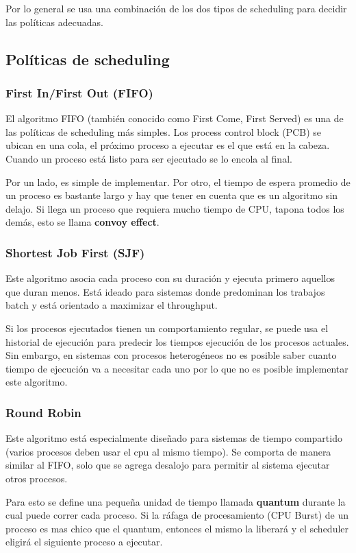 	Por lo general se usa una combinación de los dos tipos de scheduling para decidir las políticas adecuadas.

	\subsection{Políticas de scheduling}
	\subsubsection{First In/First Out (FIFO)}
	El algoritmo FIFO (también conocido como First Come, First Served) es una de las políticas de scheduling más simples. Los process control block (PCB) se ubican en una cola, el próximo proceso a ejecutar es el que está en la cabeza. Cuando un proceso está listo para ser ejecutado se lo encola al final.
	
	Por un lado, es simple de implementar. Por otro, el tiempo de espera promedio de un proceso es bastante largo y hay que tener en cuenta que es un algoritmo sin delajo. Si llega un proceso que requiera mucho tiempo de CPU, tapona todos los demás, esto se llama \textbf{convoy effect}.
	
	\subsubsection{Shortest Job First (SJF)}
	Este algoritmo asocia cada proceso con su duración y ejecuta primero aquellos que duran menos. Está ideado para sistemas donde predominan los trabajos batch y está orientado a maximizar el throughput.
	
	Si los procesos ejecutados tienen un comportamiento regular, se puede usa el historial de ejecución para predecir los tiempos ejecución de los procesos actuales. Sin embargo, en sistemas con procesos heterogéneos no es posible saber cuanto tiempo de ejecución va a necesitar cada uno por lo que no es posible implementar este algoritmo.
	
	\subsubsection{Round Robin}
	Este algoritmo está especialmente diseñado para sistemas de tiempo compartido (varios procesos deben usar el cpu al mismo tiempo). Se comporta de manera similar al FIFO, solo que se agrega desalojo para permitir al sistema ejecutar otros procesos.
	
	Para esto se define una pequeña unidad de tiempo llamada \textbf{quantum} durante la cual puede correr cada proceso. Si la ráfaga de procesamiento (CPU Burst) de un proceso es mas chico que el quantum, entonces el mismo la liberará y el scheduler eligirá el siguiente proceso a ejecutar.
	
